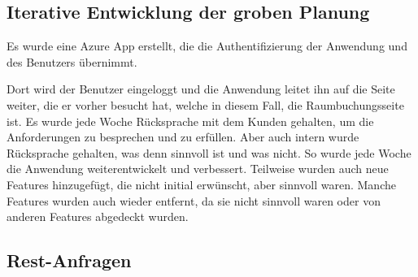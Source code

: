 \subsection{Iterative Entwicklung der groben Planung}\label{subsec:iterative-entwicklung-der-groben-planung}
Es wurde eine Azure App erstellt, die die Authentifizierung der Anwendung und des Benutzers übernimmt.
\newline

Dort wird der Benutzer eingeloggt und die Anwendung leitet ihn auf die Seite weiter, die er vorher besucht hat, welche in diesem Fall, die Raumbuchungsseite ist.
\newline
Es wurde jede Woche Rücksprache mit dem Kunden gehalten, um die Anforderungen zu besprechen und zu erfüllen.
Aber auch intern wurde Rücksprache gehalten, was denn sinnvoll ist und was nicht.
\newline
So wurde jede Woche die Anwendung weiterentwickelt und verbessert.
Teilweise wurden auch neue Features hinzugefügt, die nicht initial erwünscht, aber sinnvoll waren.
Manche Features wurden auch wieder entfernt, da sie nicht sinnvoll waren oder von anderen Features abgedeckt wurden.
\newline
\newline
\subsection{Rest-Anfragen}\label{subsec:rest-anfragen}


